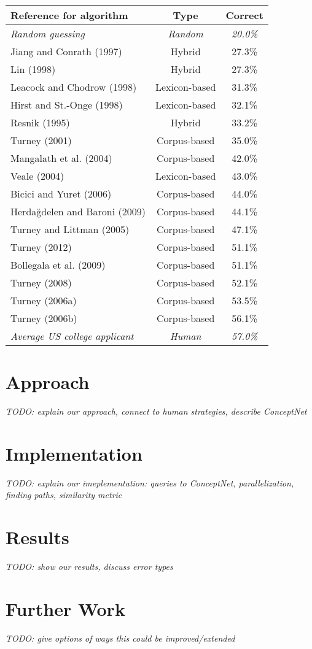 \documentclass[11pt]{article}
\begin{document}
\begin{tabular}{| l | c | c |}
\hline
\textbf{Reference for algorithm} & \textbf{Type} & \textbf{Correct} \\ \hline
\textit{Random guessing} & \textit{Random} & \textit{20.0\%} \\
Jiang and Conrath (1997) & Hybrid & 27.3\% \\
Lin (1998) & Hybrid & 27.3\% \\
Leacock and Chodrow (1998) & Lexicon-based & 31.3\% \\
Hirst and St.-Onge (1998) & Lexicon-based & 32.1\% \\
Resnik (1995) & Hybrid & 33.2\% \\
Turney (2001) & Corpus-based & 35.0\% \\
Mangalath et al. (2004) & Corpus-based & 42.0\% \\
Veale (2004) & Lexicon-based & 43.0\% \\
Bicici and Yuret (2006) & Corpus-based & 44.0\% \\
Herdağdelen and Baroni (2009) & Corpus-based & 44.1\% \\
Turney and Littman (2005) & Corpus-based & 47.1\% \\
Turney (2012) & Corpus-based & 51.1\% \\
Bollegala et al. (2009) & Corpus-based & 51.1\% \\
Turney (2008) & Corpus-based & 52.1\% \\
Turney (2006a) & Corpus-based & 53.5\% \\
Turney (2006b) & Corpus-based & 56.1\% \\
\textit{Average US college applicant} & \textit{Human} & \textit{57.0\%} \\ \hline
\end{tabular}

\section{Approach}
\textit{TODO: explain our approach, connect to human strategies, describe ConceptNet}

\section{Implementation}
\textit{TODO: explain our imeplementation: queries to ConceptNet, parallelization, finding paths, similarity metric}

\section{Results}
\textit{TODO: show our results, discuss error types}

\section{Further Work}
\textit{TODO: give options of ways this could be improved/extended}
\end{document}
